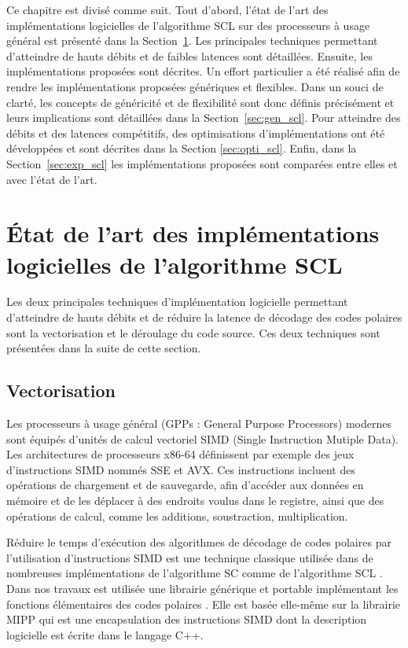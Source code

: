 Ce chapitre est divisé comme suit. Tout d'abord, l'état de l'art des implémentations logicielles de l'algorithme SCL sur des processeurs à usage général est présenté dans la Section~\ref{sec:art_scl}. Les principales techniques permettant d'atteindre de hauts débits et de faibles latences sont détaillées. Ensuite, les implémentations proposées sont décrites. Un effort particulier a été réalisé afin de rendre les implémentations proposées génériques et flexibles. Dans un souci de clarté, les concepts de généricité et de flexibilité sont donc définis précisément et leurs implications sont détaillées dans la Section~\ref{sec:gen_scl}. Pour atteindre des débits et des latences compétitifs, des optimisations d'implémentations ont été développées et sont décrites dans la Section \ref{sec:opti_scl}. Enfin, dans la Section~\ref{sec:exp_scl} les implémentations proposées sont comparées entre elles et avec l'état de l'art.

\section{\'Etat de l'art des implémentations logicielles de l'algorithme SCL}
\label{sec:art_scl}
Les deux principales techniques d'implémentation logicielle permettant d'atteindre de hauts débits et de réduire la latence de décodage des codes polaires sont la vectorisation et le déroulage du code source. Ces deux techniques sont présentées dans la suite de cette section. 

\subsection{Vectorisation}
Les processeurs à usage général (GPPs : General Purpose Processors) modernes sont équipés d'unités de calcul vectoriel SIMD (Single Instruction Mutiple Data). Les architectures de processeurs x86-64 définissent par exemple des jeux d'instructions SIMD nommés SSE et AVX. Ces instructions incluent des opérations de chargement et de sauvegarde, afin d'accéder aux données en mémoire et de les déplacer à des endroits voulus dans le registre, ainsi que des opérations de calcul, comme les additions, soustraction, multiplication.

Réduire le temps d'exécution des algorithmes de décodage de codes polaires par l'utilisation d'instructions SIMD est une technique classique utilisée dans de nombreuses implémentations de l'algorithme SC \cite{sarkis_fast_2014,giard_fast_2014,giard_low-latency_2016,sarkis_autogenerating_2014,gal_software_2014,cassagne_efficient_2015,cassagne_energy_2016,gal_multi-gb/s_2015} comme de l'algorithme SCL \cite{sarkis_fast_2016,sarkis_increasing_2014,shen_low-latency_2016}. Dans nos travaux est utilisée une librairie générique et portable implémentant les fonctions élémentaires des codes polaires \cite{cassagne_efficient_2015}. Elle est basée elle-même sur la librairie MIPP \cite{cassagne2018mipp} qui est une encapsulation des instructions SIMD dont la description logicielle est écrite dans le langage C++.

